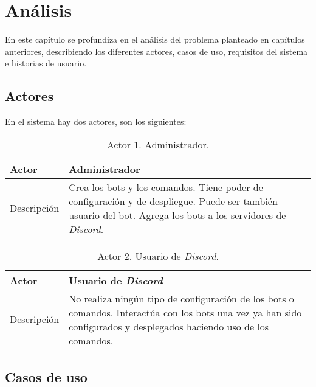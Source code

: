 \chapter{Análisis}

En este capítulo se profundiza en el análisis del problema planteado en capítulos anteriores, describiendo los diferentes actores, casos de uso, requisitos del sistema e historias de usuario.

\section{Actores}

En el sistema hay dos actores, son los siguientes:

\begin{table}[H]
    \centering
    \def\arraystretch{1.25}
    \begin{adjustbox}{max width=\textwidth}
    \begin{tabularx}{\textwidth}{|l|L|}
    \hline
        \textbf{Actor} & \textbf{Administrador} \\ \hline
    \hline
        Descripción & Crea los bots y los comandos. Tiene poder de configuración y de despliegue. Puede ser también usuario del bot. Agrega los bots a los servidores de \textit{Discord}. \\ \hline
    \end{tabularx}
    \end{adjustbox}
    \caption{Actor 1. Administrador.}
\end{table}

\begin{table}[H]
    \centering
    \def\arraystretch{1.25}
    \begin{adjustbox}{max width=\textwidth}
    \begin{tabularx}{\textwidth}{|l|L|}
    \hline
        \textbf{Actor} & \textbf{Usuario de \textit{Discord}} \\ \hline
    \hline
        Descripción & No realiza ningún tipo de configuración de los bots o comandos. Interactúa con los bots una vez ya han sido configurados y desplegados haciendo uso de los comandos. \\ \hline
    \end{tabularx}
    \end{adjustbox}
    \caption{Actor 2. Usuario de \textit{Discord}.}
\end{table}


\section{Casos de uso}

